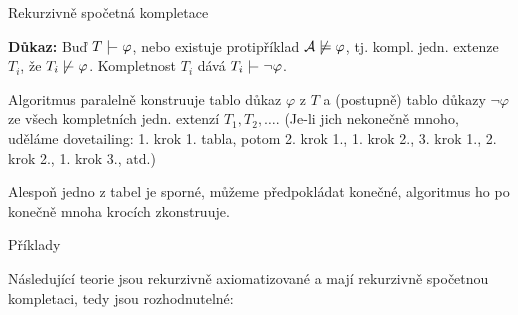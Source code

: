 \documentclass{beamer}
\begin{document}
\begin{frame}{Rekurzivně spočetná kompletace}

     
        
    \textbf{Důkaz:}
    Buď $T\proves\varphi$, nebo existuje protipříklad $\mathcal{A}\not\models\varphi$, tj. kompl. jedn. extenze $T_i$, že $T_i\not\proves\varphi$. Kompletnost $T_i$ dává $T_i\proves\neg\varphi$. 
    
    Algoritmus paralelně konstruuje tablo důkaz $\varphi$ z $T$ a (postupně) tablo důkazy $\neg\varphi$ ze všech kompletních jedn. extenzí $T_1,T_2,\dots$. (Je-li jich nekonečně mnoho, uděláme \alert{dovetailing}: 1. krok 1. tabla, potom 2. krok 1., 1. krok 2., 3. krok 1., 2. krok 2., 1. krok 3., atd.)
    
    Alespoň jedno z tabel je sporné, můžeme předpokládat konečné, algoritmus ho po konečně mnoha krocích zkonstruuje.
    \hfill\qedsymbol

\end{frame}


\begin{frame}{Příklady}
    
    Následující teorie jsou rekurzivně axiomatizované a mají rekurzivně spočetnou kompletaci, tedy jsou rozhodnutelné:


\end{frame}
\end{document}
